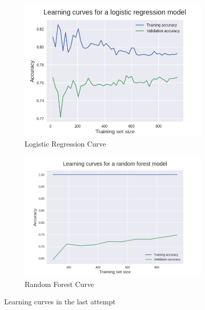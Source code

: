 \documentclass[10pt, conference]{IEEEtran}
\begin{document}
\begin{figure}[t]
    \centering
    \begin{subfigure}[b]{.5\linewidth}
        \centering
        \includegraphics[width=\linewidth]{resources/learning_curve_in-out_features_bitrate_log_regr.png}
        \caption{Logistic Regression Curve}
        \label{fig:learning-curves-last-attempt-randfor}
    \end{subfigure}%
    \begin{subfigure}[b]{.5\linewidth}
        \centering
        \includegraphics[width=\linewidth]{resources/learning_curve_in-out_features_bitrate_randfor.png}
        \caption{Random Forest Curve}
        \label{fig:learning-curves-last-attempt-logreg}
    \end{subfigure}
    \caption{Learning curves in the last attempt}
    \label{fig:learning-curves-last-attempt}
\end{figure}
\end{document}
